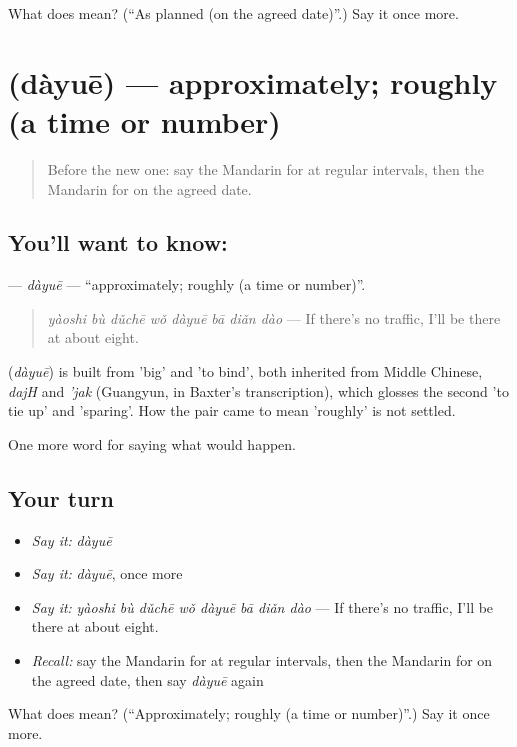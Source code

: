 \begin{tcolorbox}[breakable,colback=teal!4,colframe=teal!35!black,title={Before you move on}]
What does  mean? (\textquotedblleft{}As planned (on the agreed date)\textquotedblright{}.) Say it once more.
\end{tcolorbox}
\section[\texorpdfstring{\zh{大约} (dàyuē)}{大约 (dàyuē)}]{ (dàyuē) — approximately; roughly (a time or number)}

\label{lesson:ZH-C390-dayue}



\begin{quote}
Before the new one: say the Mandarin for at regular intervals, then the Mandarin for on the agreed date.
\end{quote}

\subsection*{You'll want to know: }
\textbf{} — \emph{dàyuē} — \textquotedblleft{}approximately; roughly (a time or number)\textquotedblright{}.

\begin{quote}
\emph{yàoshi bù dǔchē wǒ dàyuē bā diǎn dào} — If there's no traffic, I'll be there at about eight.
\end{quote}

\begin{cousinweb}
\textbf{} (\emph{dàyuē}) is built from  'big' and  'to bind', both inherited from Middle Chinese, \emph{dajH} and \emph{'jak} (Guangyun, in Baxter's transcription), which glosses the second 'to tie up' and 'sparing'. How the pair came to mean 'roughly' is not settled.
\end{cousinweb}

\begin{grammarlens}[title={What you've built}]
One more word for saying what would happen.
\end{grammarlens}

\subsection*{Your turn}
\begin{itemize}
\raggedright
  \item \emph{Say it:} \emph{dàyuē}
  \item \emph{Say it:} \emph{dàyuē}, once more
  \item \emph{Say it:} \emph{yàoshi bù dǔchē wǒ dàyuē bā diǎn dào} — If there's no traffic, I'll be there at about eight.
  \item \emph{Recall:} say the Mandarin for at regular intervals, then the Mandarin for on the agreed date, then say \emph{dàyuē} again
\end{itemize}

\begin{tcolorbox}[breakable,colback=teal!4,colframe=teal!35!black,title={Before you move on}]
What does  mean? (\textquotedblleft{}Approximately; roughly (a time or number)\textquotedblright{}.) Say it once more.
\end{tcolorbox}
